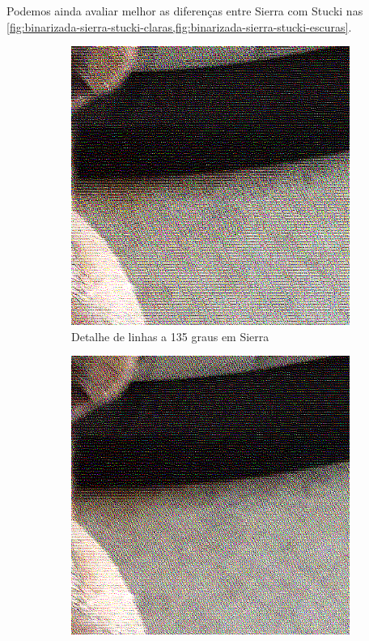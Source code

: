 \documentclass[brazilian,a4paper,twocolumn]{article}
\begin{document}
        Podemos ainda avaliar melhor as diferenças entre Sierra com Stucki nas \cref{fig:binarizada-sierra-stucki-claras,fig:binarizada-sierra-stucki-escuras}.

        \begin{figure}
            \centering
            \begin{subfigure}{0.24\textwidth}
                \includegraphics[width=\textwidth,keepaspectratio]{../imgs/mel_binarizada-sierra-detalhe1.png}
                \caption{Detalhe de linhas a 135 graus em Sierra}
            \end{subfigure}
            \begin{subfigure}{0.24\textwidth}
                \includegraphics[width=\textwidth,keepaspectratio]{../imgs/mel_binarizada-stucki-detalhe1.png}

\end{subfigure}
\end{figure}
\end{document}
